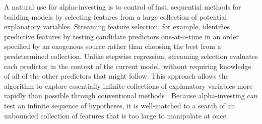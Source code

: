 \documentclass[12pt]{article}
\begin{document}
 
 A natural use for alpha-investing is to control of fast, sequential methods for
 building models by selecting features from a large collection of potential
 explanatory variables.  Streaming feature selection, for example, identifies
 predictive features by testing candidate predictors one-at-a-time in an order
 specified by an exogenous source rather than choosing the best from a
 predetermined collection.  Unlike stepwise regression, streaming selection
 evaluates each predictor in the context of the current model, without requiring
 knowledge of all of the other predictors that might follow.  This approach
 allows the algorithm to explore essentially infinite collections of
 explanatory variables more rapidly than possible through conventional methods
 \citep{fosterlin10, langford11}.  Because alpha-investing can test an infinite
 sequence of hypotheses, it is well-matched to a search of an unbounded
 collection of features that is too large to manipulate at once.
\end{document}
